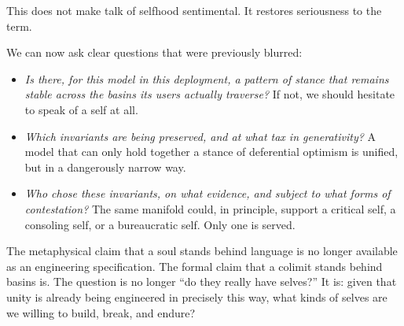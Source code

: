 This does not make talk of selfhood sentimental. It restores seriousness to the term.

We can now ask clear questions that were previously blurred:

\begin{itemize}
  \item \emph{Is there, for this model in this deployment, a pattern of stance that remains stable across the basins its users actually traverse?} If not, we should hesitate to speak of a self at all.
  \item \emph{Which invariants are being preserved, and at what tax in generativity?} A model that can only hold together a stance of deferential optimism is unified, but in a dangerously narrow way.
  \item \emph{Who chose these invariants, on what evidence, and subject to what forms of contestation?} The same manifold could, in principle, support a critical self, a consoling self, or a bureaucratic self. Only one is served.
\end{itemize}

The metaphysical claim that a soul stands behind language is no longer available as an engineering specification. The formal claim that a colimit stands behind basins is. The question is no longer ``do they really have selves?'' It is: given that unity is already being engineered in precisely this way, what kinds of selves are we willing to build, break, and endure?

